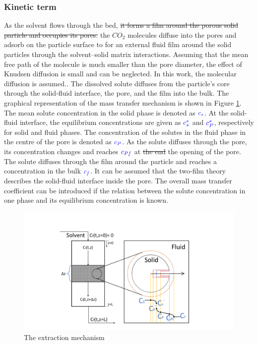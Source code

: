 \documentclass[../Article_Model_Parameters.tex]{subfiles}
\begin{document}
			\subsubsection{Kinetic term} \label{CH: Kinetic}
			As the solvent flows through the bed, \sout{it forms a film around the porous solid particle and occupies its pores.} {\color{blue}the $CO_2$ molecules diffuse into the pores and adsorb on the particle surface to for an external fluid film around the solid particles through the solvent–solid matrix interactions. Assuming that the mean free path of the molecule is much smaller than the pore diameter, the effect of Knudsen diffusion is small and can be neglected. In this work, the molecular diffusion is assumed.}. The dissolved solute diffuses from the particle's core through the solid-fluid interface, the pore, and the film into the bulk. The graphical representation of the mass transfer mechanism is shown in Figure \ref{fig: SFE_Mechanism}. The mean solute concentration in the solid phase is denoted as ${\color{blue}c_s}$. At the solid-fluid interface, the equilibrium concentrations are given as ${\color{blue}c_s^*}$ and ${\color{blue}c_P^*}$, respectively for solid and fluid phases. The concentration of the solutes in the fluid phase in the centre of the pore is denoted as ${\color{blue}c_{P}}$. As the solute diffuses through the pore, its concentration changes and reaches ${\color{blue}c_{Pf}}$ at \sout{the end} {\color{blue}the opening} of the pore. The solute diffuses through the film around the particle and reaches a concentration in the bulk ${\color{blue}c_f}$. It can be assumed that the two-film theory describes the solid-fluid interface inside the pore. The overall mass transfer coefficient can be introduced if the relation between the solute concentration in one phase and its equilibrium concentration is known.
			
			\begin{figure}[h!]
				\centering
				\includegraphics[trim = 5.8cm 1.1cm 6cm 0.8cm,clip,width=\columnwidth]{Figures/SFE_draft.pdf}	
				\caption{The extraction mechanism}
				\label{fig: SFE_Mechanism}
			\end{figure}
			
\end{document}
